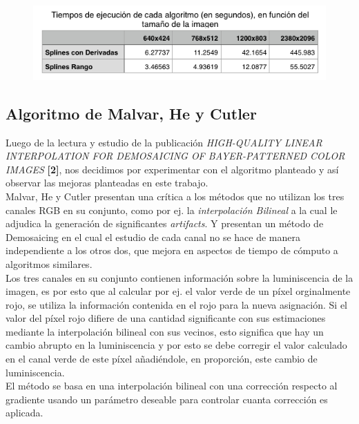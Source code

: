 \documentclass[a4paper]{article}
\begin{document}
\begin{figure}[h!]
    \begin{center}
    \includegraphics[scale=0.70]{imagenes/tiempos/derrangt.png}
    \label{tiempos1}
  \end{center}
\end{figure}

\newpage
\subsection{Algoritmo de Malvar, He y Cutler}

Luego de la lectura y estudio de la publicaci\'on \textit{HIGH-QUALITY LINEAR INTERPOLATION
FOR DEMOSAICING OF BAYER-PATTERNED COLOR IMAGES} \textbf{[2]}, nos decidimos por experimentar con el algoritmo planteado y as\'i observar las mejoras planteadas en este trabajo.\\

Malvar, He y Cutler presentan una cr\'itica a los m\'etodos que no utilizan los tres canales RGB en su conjunto, como por ej. la \emph{interpolaci\'on Bilineal} a la cual le adjudica la generaci\'on de significantes \textit{artifacts}. Y presentan un m\'etodo de Demosaicing en el cual el estudio de cada canal no se hace de manera independiente a los otros dos, que mejora en aspectos de tiempo de c\'omputo a algoritmos similares.\\

Los tres canales en su conjunto contienen informaci\'on sobre la luminiscencia de la imagen, es por esto que al calcular por ej. el valor verde de un p\'ixel orginalmente rojo, se utiliza la informaci\'on contenida en el rojo para la nueva asignaci\'on. Si el valor del p\'ixel rojo difiere de una cantidad significante con sus estimaciones mediante la interpolaci\'on bilineal con sus vecinos, esto significa que hay un cambio abrupto en la luminiscencia y por esto se debe corregir el valor calculado en el canal verde de este p\'ixel a\~nadi\'endole, en proporci\'on, este cambio de luminiscencia.\\

El m\'etodo se basa en una interpolaci\'on bilineal con una correcci\'on respecto al gradiente usando un par\'ametro deseable para controlar cuanta correcci\'on es aplicada.\\
\end{document}
